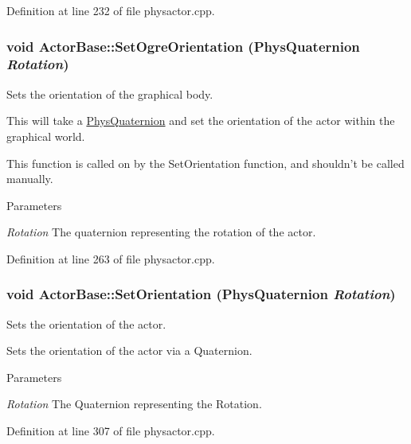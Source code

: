 Definition at line 232 of file physactor.cpp.

\hypertarget{classActorBase_a55f45703e3d9b8de0cd07b23bd9460bf}{
\subsubsection[{SetOgreOrientation}]{\setlength{\rightskip}{0pt plus 5cm}void ActorBase::SetOgreOrientation ({\bf PhysQuaternion} {\em Rotation})}}
\label{dd/d7b/classActorBase_a55f45703e3d9b8de0cd07b23bd9460bf}


Sets the orientation of the graphical body. 

This will take a \hyperlink{classPhysQuaternion}{PhysQuaternion} and set the orientation of the actor within the graphical world. \par
 This function is called on by the SetOrientation function, and shouldn't be called manually. 
\begin{DoxyParams}{Parameters}
\item[{\em Rotation}]The quaternion representing the rotation of the actor. \end{DoxyParams}


Definition at line 263 of file physactor.cpp.

\hypertarget{classActorBase_a5fe558ca0a88061615cda52a4dc5bf66}{
\subsubsection[{SetOrientation}]{\setlength{\rightskip}{0pt plus 5cm}void ActorBase::SetOrientation ({\bf PhysQuaternion} {\em Rotation})}}
\label{dd/d7b/classActorBase_a5fe558ca0a88061615cda52a4dc5bf66}


Sets the orientation of the actor. 

Sets the orientation of the actor via a Quaternion. 
\begin{DoxyParams}{Parameters}
\item[{\em Rotation}]The Quaternion representing the Rotation. \end{DoxyParams}


Definition at line 307 of file physactor.cpp.

